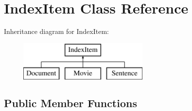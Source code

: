 \hypertarget{class_index_item}{}\section{Index\+Item Class Reference}
\label{class_index_item}
Inheritance diagram for Index\+Item\+:\begin{figure}[H]
\begin{center}
\leavevmode
\includegraphics[height=2.000000cm]{class_index_item}
\end{center}
\end{figure}
\subsection*{Public Member Functions}
